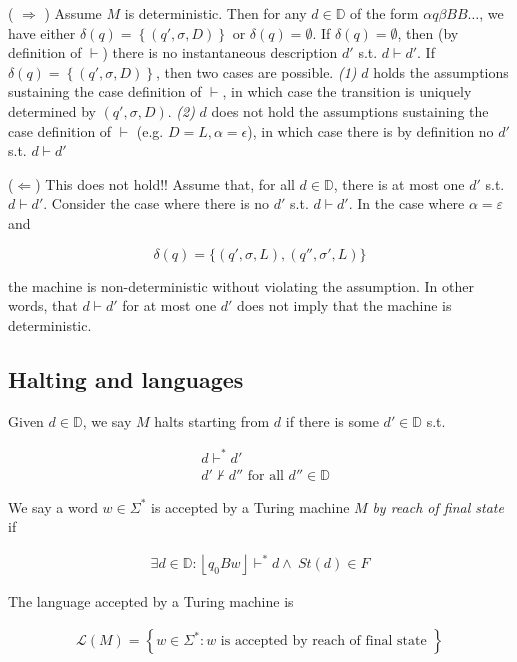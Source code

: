 \documentclass[a4paper, 12pt]{article}
\begin{document}
( $\Rightarrow$ ) Assume $M$ is deterministic. Then for any $d \in \mathbb{D}$
of the form $\alpha q \beta B B \ldots$, we have either $\delta(q) = \left\{
(q', \sigma, D) \right\} $ or $\delta(q) = \emptyset$. If $\delta(q) =
\emptyset$, then (by definition of $\vdash$) there is no instantaneous description $d'$ s.t. $d \vdash d'$.
If $\delta(q) = \left\{ (q', \sigma, D) \right\} $, then two cases are possible.
\textit{(1)} $d$ holds the assumptions sustaining the case definition of
$\vdash$, in which case the transition is uniquely determined by $(q',
\sigma, D)$. \textit{(2)} $d$ does not hold the assumptions sustaining the
case definition of $\vdash$ (e.g. $D = L, \alpha = \epsilon$), in which case
there is by definition no $d'$ s.t. $d \vdash d'$

($\Leftarrow$) This does not hold!! Assume that, for all $d \in \mathbb{D}$,
there is at most one $d'$ s.t. $d \vdash d'$. 
 Consider the case where there is no $d'$ s.t. $d \vdash d'$. In the case where
 $\alpha = \varepsilon$ and

$$
\delta(q) = \{ (q', \sigma, L), (q'', \sigma', L) \}
$$

the machine is non-deterministic without violating the assumption. In other
words, that $d \vdash d'$ for at most one $d'$ does not imply that the machine
is deterministic.

\subsection{Halting and languages}

Given $d \in \mathbb{D}$, we say $M$ halts starting from $d$ if there is some
$d' \in \mathbb{D}$ s.t. 

\begin{align*}
    &d \vdash^* d' \\ 
    &d' \not\vdash d'' \text{ for all } d'' \in \mathbb{D}
\end{align*}

We say a word $w \in \Sigma^{*}$ is accepted by a Turing machine $M$ \textit{by reach of final
state} if

\begin{align*}
    \exists d \in \mathbb{D} : \left\lfloor q_0 B w \right\rfloor \vdash^* d \land ~ St(d) \in F
\end{align*}

The language accepted by a Turing machine is 

\begin{align*}
    \mathcal{L}(M) = \left\{w \in \Sigma^{*}:  w \text{ is accepted by reach of final state } \right\} 
\end{align*}
\end{document}
